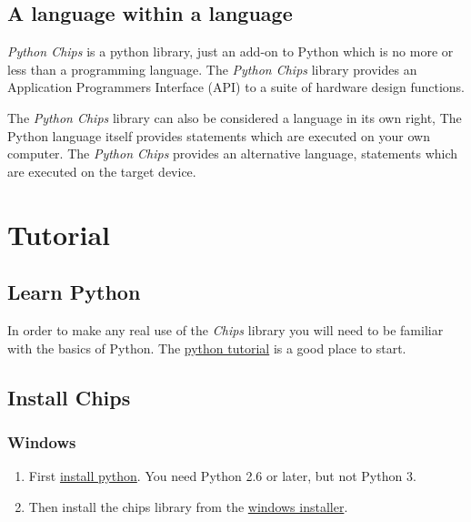 \documentclass[letterpaper,10pt,english]{manual}
\begin{document}
\section{A language within a language}

\emph{Python Chips} is a python library, just an add-on to Python which is no
more or less than a programming language. The \emph{Python Chips} library
provides an Application Programmers Interface (API) to a suite of hardware
design functions.

The \emph{Python Chips} library can also be considered a language in its own
right, The Python language itself provides statements which are executed on
your own computer. The \emph{Python Chips} provides an alternative language,
statements which are executed on the target device.

\resetcurrentobjects
\hypertarget{--doc-tutorial/index}{}

\chapter{Tutorial}


\section{Learn Python}

In order to make any real use of the \emph{Chips} library you will need to be
familiar with the basics of Python. The \href{http://docs.python.org/tut}{python tutorial} is a good place
to start.


\section{Install Chips}


\subsection{Windows}
\begin{enumerate}
\item {} 
First \href{http://python.org/download}{install python}. You need Python 2.6 or later, but not Python 3.

\item {} 
Then install the chips library from the \href{http://github.com/dawsonjon/chips}{windows installer}.

\end{enumerate}
\end{document}
